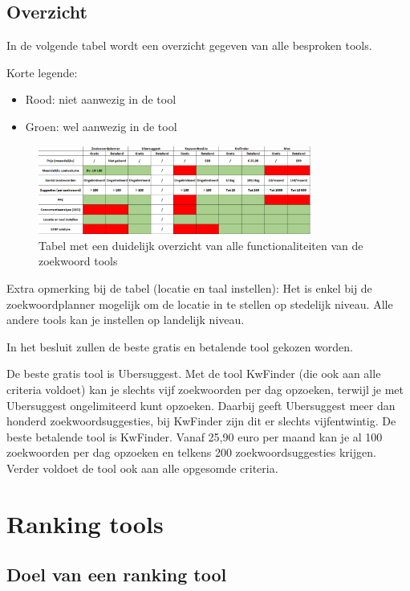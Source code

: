 \newpage
\subsection{Overzicht}
\label{ch: Overzicht}

In de volgende tabel wordt een overzicht gegeven van alle besproken tools. 

Korte legende: 
\begin{itemize}
\item Rood: niet aanwezig in de tool
\item Groen: wel aanwezig in de tool
\end{itemize}

\begin{figure}[h!]
\centering
\includegraphics[width=0.8\textwidth]{img/zoekwoordtabel.PNG}
\caption{Tabel met een duidelijk overzicht van alle functionaliteiten van de zoekwoord tools}
\end{figure}

Extra opmerking bij de tabel (locatie en taal instellen): Het is enkel bij de zoekwoordplanner mogelijk om de locatie in te stellen op stedelijk niveau. Alle andere tools kan je instellen op landelijk niveau. 

In het besluit zullen de beste gratis en betalende tool gekozen worden.

De beste gratis tool is Ubersuggest. Met de tool KwFinder (die ook aan alle criteria voldoet) kan je slechts vijf zoekwoorden per dag opzoeken, terwijl je met Ubersuggest ongelimiteerd kunt opzoeken. Daarbij geeft Ubersuggest meer dan honderd zoekwoordsuggesties, bij KwFinder zijn dit er slechts vijfentwintig. 
De beste betalende tool is KwFinder. Vanaf 25,90 euro per maand kan je al 100 zoekwoorden per dag opzoeken en telkens 200 zoekwoordsuggesties krijgen. Verder voldoet de tool ook aan alle opgesomde criteria. 

\newpage
\section{Ranking tools}
\label{ch: Ranking tools}

\subsection{Doel van een ranking tool}
\label{ch: Doel van een ranking tool}

